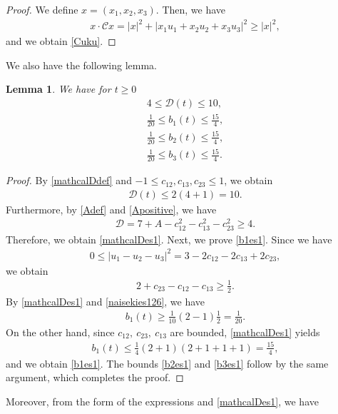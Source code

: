 \documentclass[reqno]{amsart}
\theoremstyle{plain}
\newtheorem{lemma}[theorem]{Lemma}
\theoremstyle{definition}
\numberwithin{equation}{section}
\newcommand{\1}{\mathbbm{1}}
\begin{document}
\begin{proof}
We define $x=(x_1,x_2,x_3)$. Then, we have
\begin{align*}
x\cdot \mathcal{C}x=|x|^2+|x_1u_1+x_2u_2+x_3u_3|^2\geq |x|^2,
\end{align*}
and we obtain \eqref{Cuku}.
\end{proof}
We also have the following lemma.
\begin{lemma}\label{bDes1}
We have for $t\geq 0$
\begin{align}
4\leq \mathcal{D}(t)\leq10, \label{mathcalDes1}
\\
\frac{1}{20}\leq b_1(t)\leq\frac{15}{4}, \label{b1es1}
\\
\frac{1}{20}\leq b_2(t)\leq\frac{15}{4}, \label{b2es1}
\\
\frac{1}{20}\leq b_3(t)\leq\frac{15}{4}. \label{b3es1}
\end{align}
\end{lemma}
\begin{proof}
By \eqref{mathcalDdef} and $-1\leq c_{12},c_{13},c_{23}\leq 1$, we obtain 
\begin{align*}
\mathcal{D}(t)\leq 2(4+1)=10.
\end{align*}
Furthermore, by \eqref{Adef} and \eqref{Apositive}, we have
\begin{align*}
\mathcal{D}=7+A-c_{12}^2-c_{13}^2-c_{23}^2\geq 4.
\end{align*}
Therefore, we obtain \eqref{mathcalDes1}. Next, we prove \eqref{b1es1}. Since we have
\begin{align*}
0\leq |u_1-u_2-u_3|^2=3-2c_{12}-2c_{13}+2c_{23},
\end{align*}
we obtain
\begin{align}\label{naisekies126}
2+c_{23}-c_{12}-c_{13}\geq \frac{1}{2}.
\end{align}
By \eqref{mathcalDes1} and \eqref{naisekies126}, we have
\begin{align*}
b_1(t)\geq \frac{1}{10}(2-1)\frac{1}{2}=\frac{1}{20}.
\end{align*}
On the other hand, since $c_{12},\ c_{23},\ c_{13}$ are bounded, \eqref{mathcalDes1} yields
\begin{align*}
b_1(t)\leq \frac{1}{4}(2+1)(2+1+1+1)=\frac{15}{4},
\end{align*}
and we obtain \eqref{b1es1}. The bounds \eqref{b2es1} and \eqref{b3es1} follow by the same argument, which completes the proof.
\end{proof}
Moreover, from the form of the expressions and \eqref{mathcalDes1}, we have
\end{document}
